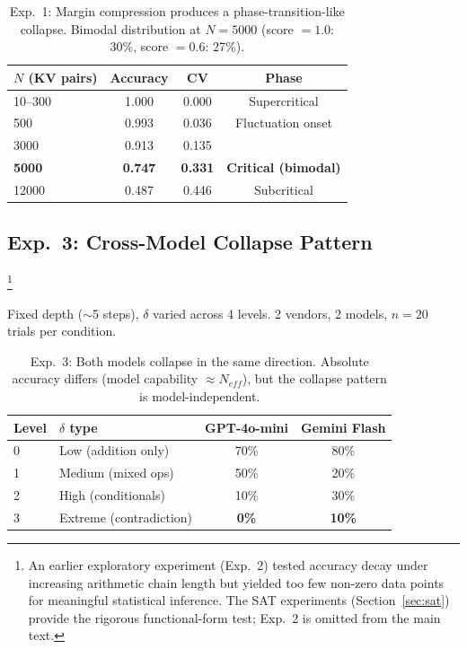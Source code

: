 \documentclass[11pt,a4paper]{article}
\begin{document}
\begin{table}[htbp]
\centering
\begin{tabular}{lccc}
\toprule
\textbf{$N$ (KV pairs)} & \textbf{Accuracy} & \textbf{CV} & \textbf{Phase} \\
\midrule
10--300 & 1.000 & 0.000 & Supercritical \\
500 & 0.993 & 0.036 & Fluctuation onset \\
3000 & 0.913 & 0.135 & \\
\textbf{5000} & \textbf{0.747} & \textbf{0.331} & \textbf{Critical (bimodal)} \\
12000 & 0.487 & 0.446 & Subcritical \\
\bottomrule
\end{tabular}
\caption{Exp.~1: Margin compression produces a phase-transition-like collapse. Bimodal distribution at $N = 5000$ (score $= 1.0$: 30\%, score $= 0.6$: 27\%).}
\label{tab:exp1}
\end{table}

\subsection{Exp.~3: Cross-Model Collapse Pattern}\footnote{An earlier exploratory experiment (Exp.~2) tested accuracy decay under increasing arithmetic chain length but yielded too few non-zero data points for meaningful statistical inference. The SAT experiments (Section~\ref{sec:sat}) provide the rigorous functional-form test; Exp.~2 is omitted from the main text.}

Fixed depth ($\sim$5 steps), $\delta$ varied across 4 levels. 2 vendors, 2 models, $n = 20$ trials per condition.

\begin{table}[htbp]
\centering
\begin{tabular}{llcc}
\toprule
\textbf{Level} & \textbf{$\delta$ type} & \textbf{GPT-4o-mini} & \textbf{Gemini Flash} \\
\midrule
0 & Low (addition only) & 70\% & 80\% \\
1 & Medium (mixed ops) & 50\% & 20\% \\
2 & High (conditionals) & 10\% & 30\% \\
3 & Extreme (contradiction) & \textbf{0\%} & \textbf{10\%} \\
\bottomrule
\end{tabular}
\caption{Exp.~3: Both models collapse in the same direction. Absolute accuracy differs (model capability $\approx N_{eff}$), but the collapse pattern is model-independent.}
\label{tab:exp3}
\end{table}
\end{document}
